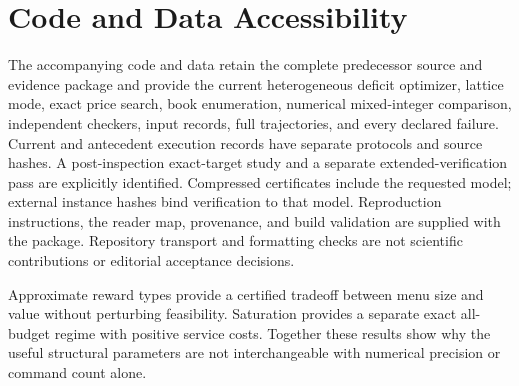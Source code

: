 \section*{Code and Data Accessibility}
The accompanying code and data retain the complete predecessor source and evidence package and provide the current heterogeneous deficit optimizer, lattice mode, exact price search, book enumeration, numerical mixed-integer comparison, independent checkers, input records, full trajectories, and every declared failure. Current and antecedent execution records have separate protocols and source hashes. A post-inspection exact-target study and a separate extended-verification pass are explicitly identified. Compressed certificates include the requested model; external instance hashes bind verification to that model. Reproduction instructions, the reader map, provenance, and build validation are supplied with the package. Repository transport and formatting checks are not scientific contributions or editorial acceptance decisions.

Approximate reward types provide a certified tradeoff between menu size and value without perturbing feasibility. Saturation provides a separate exact all-budget regime with positive service costs. Together these results show why the useful structural parameters are not interchangeable with numerical precision or command count alone.
